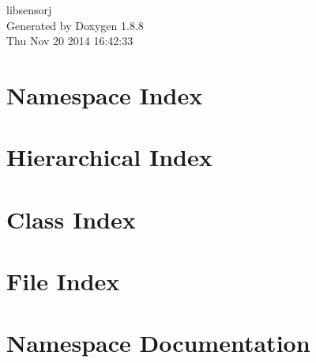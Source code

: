 \documentclass[twoside]{book}
\newcommand{\+}{\discretionary{\mbox{\scriptsize$\hookleftarrow$}}{}{}}
\newcommand{\clearemptydoublepage}{%
  \newpage{\pagestyle{empty}\cleardoublepage}%
}
\begin{document}
\hypersetup{pageanchor=false,
             bookmarks=true,
             bookmarksnumbered=true,
             pdfencoding=unicode
            }
\begin{titlepage}
\vspace*{7cm}
\begin{center}%
{\Large libsensorj }\\
\vspace*{1cm}
{\large Generated by Doxygen 1.8.8}\\
\vspace*{0.5cm}
{\small Thu Nov 20 2014 16:42:33}\\
\end{center}
\end{titlepage}
\clearemptydoublepage
\tableofcontents
\clearemptydoublepage
{}
\hypersetup{pageanchor=true}

\chapter{Namespace Index}

\chapter{Hierarchical Index}

\chapter{Class Index}

\chapter{File Index}

\chapter{Namespace Documentation}











\end{document}
